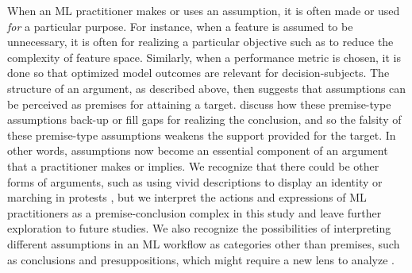 When an ML practitioner makes or uses an assumption, it is often made or used \textit{for} a particular purpose.
For instance, when a feature is assumed to be unnecessary, it is often for realizing a particular objective such as to reduce the complexity of feature space. 
Similarly, when a performance metric is chosen, it is done so that optimized model outcomes are relevant for decision-subjects. The structure of an argument, as described above, then suggests that assumptions can be perceived as premises for attaining a target.
\citet{ennis1982identifying} discuss how these premise-type assumptions back-up or fill gaps for realizing the conclusion, and so the falsity of these premise-type assumptions weakens the support provided for the target. In other words, assumptions now become an essential component of an argument that a practitioner makes or implies. We recognize that there could be other forms of arguments, such as using vivid descriptions to display an identity or marching in protests \cite{jacobs2000rhetoric,hample2015arguing}, but we interpret the actions and expressions of ML practitioners as a premise-conclusion complex in this study and leave further exploration to future studies.
We also recognize the possibilities of interpreting different assumptions in an ML workflow as categories other than premises, such as conclusions and presuppositions, which might require a new lens to analyze \cite{walton2008argumentation,ennis1982identifying}.

